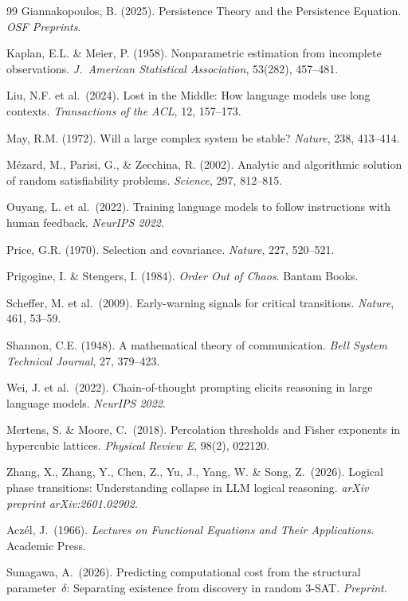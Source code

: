 \documentclass[11pt,a4paper]{article}
\begin{document}
\begin{thebibliography}{99}
Giannakopoulos, B. (2025).
Persistence Theory and the Persistence Equation.
\emph{OSF Preprints}.

Kaplan, E.L. \& Meier, P. (1958).
Nonparametric estimation from incomplete observations.
\emph{J.\ American Statistical Association}, 53(282), 457--481.

Liu, N.F. et al.\ (2024).
Lost in the Middle: How language models use long contexts.
\emph{Transactions of the ACL}, 12, 157--173.

May, R.M. (1972).
Will a large complex system be stable?
\emph{Nature}, 238, 413--414.

M\'{e}zard, M., Parisi, G., \& Zecchina, R. (2002).
Analytic and algorithmic solution of random satisfiability problems.
\emph{Science}, 297, 812--815.

Ouyang, L. et al.\ (2022).
Training language models to follow instructions with human feedback.
\emph{NeurIPS 2022}.

Price, G.R. (1970).
Selection and covariance.
\emph{Nature}, 227, 520--521.

Prigogine, I. \& Stengers, I. (1984).
\emph{Order Out of Chaos}.
Bantam Books.

Scheffer, M. et al.\ (2009).
Early-warning signals for critical transitions.
\emph{Nature}, 461, 53--59.

Shannon, C.E. (1948).
A mathematical theory of communication.
\emph{Bell System Technical Journal}, 27, 379--423.

Wei, J. et al.\ (2022).
Chain-of-thought prompting elicits reasoning in large language models.
\emph{NeurIPS 2022}.

Mertens, S. \& Moore, C.\ (2018).
Percolation thresholds and Fisher exponents in hypercubic lattices.
\emph{Physical Review E}, 98(2), 022120.

Zhang, X., Zhang, Y., Chen, Z., Yu, J., Yang, W. \& Song, Z.\ (2026).
Logical phase transitions: Understanding collapse in LLM logical reasoning.
\emph{arXiv preprint arXiv:2601.02902}.

Acz\'{e}l, J.\ (1966).
\emph{Lectures on Functional Equations and Their Applications}.
Academic Press.

Sunagawa, A.\ (2026).
Predicting computational cost from the structural parameter~$\delta$: Separating existence from discovery in random 3-SAT.
\emph{Preprint}.


\end{thebibliography}
\end{document}
